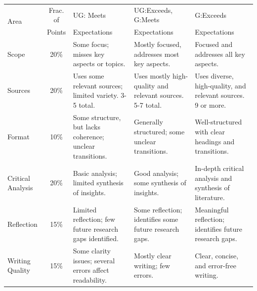 \documentclass[11pt]{article}
\begin{document}
\begin{landscape}
\begin{table}
    \centering
    \small
    \begin{tabular}{p{.75in} c  p{2.25in}  p{2.25in}  p{2.25in}}
        \multirow{2}{*}{Area}  	& Frac. of   	& UG: Meets		& UG:Exceeds, G:Meets   & G:Exceeds 	  \\
                                & Points & Expectations  & Expectations  		& Expectations \\
        \toprule
        Scope               	& 20\%\vspace{.25in} 				& Some focus; misses key aspects or topics. & Mostly focused, addresses most key aspects. & Focused and addresses all key aspects. \\
        \midrule
        Sources                 & 20\%\vspace{.25in}				& Uses some relevant sources; limited variety. 3-5 total. & Uses mostly high-quality and relevant sources. 5-7 total. & Uses diverse, high-quality, and relevant sources. 9 or more. \\
        \midrule
        Format                 & 10\%\vspace{.25in}				& Some structure, but lacks coherence; unclear transitions. & Generally structured; some unclear transitions. & Well-structured with clear headings and transitions. \\
        \midrule
        Critical Analysis       & 20\%\vspace{.25in}				& Basic analysis; limited synthesis of insights. & Good analysis; some synthesis of insights. & In-depth critical analysis and synthesis of literature. \\
        \midrule
        Reflection 		        & 15\%\vspace{.25in}				& Limited reflection; few future research gaps identified. & Some reflection; identifies some future research gaps. & Meaningful reflection; identifies future research gaps. \\
        \midrule
        Writing Quality 		& 15\%\vspace{.25in}				& Some clarity issues; several errors affect readability. & Mostly clear writing; few errors. & Clear, concise, and error-free writing. \\
        \bottomrule
    \end{tabular}
\end{table}
\end{landscape}
\end{document}
